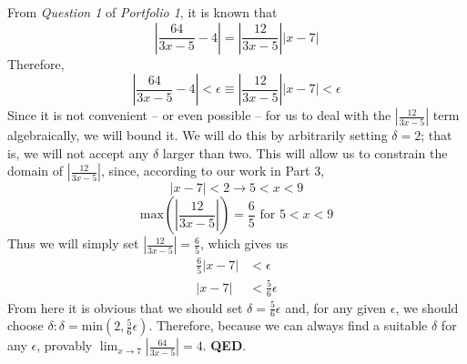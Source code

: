 \documentclass{article}
\begin{document}
\noindent From  \textit{Question 1} of  \textit{Portfolio 1}, it is known that
$$ \left| \frac{64}{3x-5} - 4 \right| = \left| \frac{12}{3x-5} \right| \left|x-7\right|$$
Therefore,
$$  \left| \frac{64}{3x-5}  - 4 \right| < \epsilon \equiv \left| \frac{12}{3x-5} \right| \left|x-7\right| < \epsilon $$
Since it is not convenient -- or even possible -- for us to deal with the $\displaystyle \left| \frac{12}{3x-5} \right|$ term algebraically, we will bound it. 
We will do this by arbitrarily setting $\delta = 2$; that is, we will not accept any $\delta$ larger than two. 
This will allow us to constrain the domain of $\displaystyle \left| \frac{12}{3x-5} \right|$, 
since, according to our work in Part 3, 
$$\left|x-7\right| < 2 \rightarrow 5 < x < 9$$
$$\text{max}\left(\left| \frac{12}{3x-5} \right|\right) = \frac{6}{5} \text{ for } 5 < x < 9 $$
Thus we will simply set $\left| \frac{12}{3x-5} \right| = \frac{6}{5}$, which gives us 
\begin{align*}
\frac{6}{5}\left|x-7\right| &< \epsilon\\
\left| x-7 \right| &< \frac{5}{6}\epsilon
\end{align*}
From here it is obvious that we should set $\delta = \frac{5}{6}\epsilon$ and, for any given $\epsilon$, we should choose $\delta : \delta = \text{min}\left(2, \frac{5}{6}\epsilon\right)$. 
Therefore, because we can always find a suitable $\delta$ for any $\epsilon$, provably $
\displaystyle \lim_{x\to7} \left| \frac{64}{3x-5} \right| = 4$. \textbf{QED}.
\end{document}
